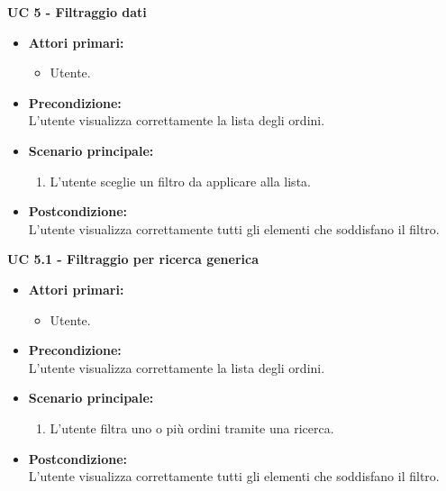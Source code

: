 \vspace{0.5cm}

\noindent \textbf{\large UC 5 - Filtraggio dati}
\label{uc:filtraggio-dati}
\begin{itemize}

	\item \textbf{Attori primari: }
		\begin{itemize}
			\item Utente.
		\end{itemize}

	\item \textbf{Precondizione: }\\[0.3cm]
		L'utente visualizza correttamente la lista degli ordini.

	\item \textbf{Scenario principale: }
		\begin{enumerate}
			\item L'utente sceglie un filtro da applicare alla lista.
		\end{enumerate}
		

	\item \textbf{Postcondizione: }\\[0.3cm]
		L'utente visualizza correttamente tutti gli elementi che soddisfano il filtro.

\end{itemize}

\vspace{0.5cm}

\noindent \textbf{\large UC 5.1 - Filtraggio per ricerca generica}
\label{uc:filtraggio-ricerca-generica}
\begin{itemize}

	\item \textbf{Attori primari: }
		\begin{itemize}
			\item Utente.
		\end{itemize}

	\item \textbf{Precondizione: }\\[0.3cm]
		L'utente visualizza correttamente la lista degli ordini.

	\item \textbf{Scenario principale: }
		\begin{enumerate}
			\item L'utente filtra uno o più ordini tramite una ricerca.
		\end{enumerate}
		

	\item \textbf{Postcondizione: }\\[0.3cm]
		L'utente visualizza correttamente tutti gli elementi che soddisfano il filtro.

\end{itemize}

